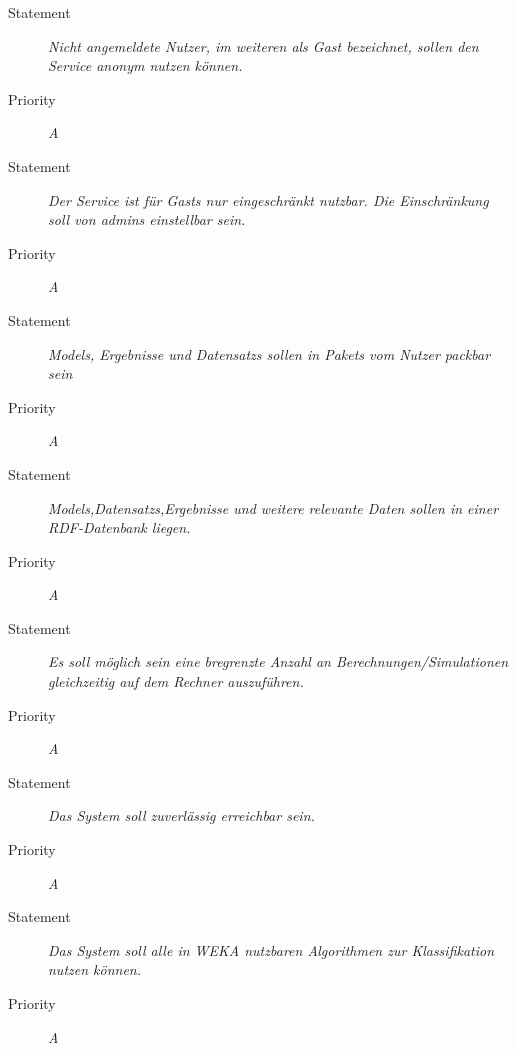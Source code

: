 \UR
\begin{description}
\item[Statement] \textit{Nicht angemeldete Nutzer, im weiteren als \gls{Gast} bezeichnet, sollen den Service anonym nutzen können.}
\item[Priority] \textit{A}
\end{description}

\UR
\begin{description}
\item[Statement] \textit{Der Service ist für \glspl{Gast} nur eingeschränkt nutzbar. Die Einschränkung soll von \glspl{admin} einstellbar sein.}
\item[Priority] \textit{A}
\end{description}

\UR
\begin{description}
\item[Statement] \textit{\glspl{Model}, Ergebnisse und \glspl{Datensatz} sollen in \glspl{Paket} vom Nutzer packbar sein}%
\item[Priority] \textit{A}
\end{description}

\UR
\begin{description}
\item[Statement] \textit{\glspl{Model},\glspl{Datensatz},Ergebnisse und weitere relevante Daten sollen in einer \gls{RDF}-Datenbank liegen.}%
\item[Priority] \textit{A}
\end{description}

\UR
\begin{description}
\item[Statement] \textit{Es soll möglich sein eine bregrenzte Anzahl an Berechnungen/Simulationen gleichzeitig auf dem Rechner auszuführen.} %
\item[Priority] \textit{A}
\end{description}

\UR
\begin{description}
\item[Statement] \textit{Das System soll zuverlässig erreichbar sein.}
\item[Priority] \textit{A}
\end{description}

\UR
\begin{description}
  \item[Statement]
    \textit{Das System soll alle in WEKA nutzbaren Algorithmen zur Klassifikation nutzen können.}
  \item[Priority]
    \textit{A}
\end{description}

